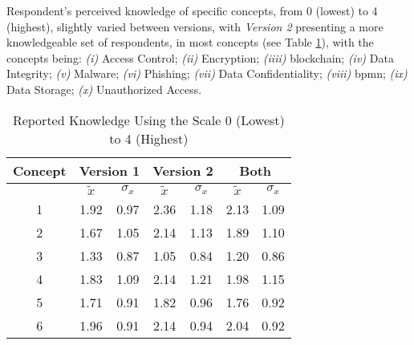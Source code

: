 Respondent's perceived knowledge of specific concepts, from 0 (lowest) to 4 (highest), slightly varied between versions, with \textit{Version 2} presenting a more knowledgeable set of respondents, in most concepts (see Table \ref{tab: knowledge}), with the concepts being: \emph{(i)} Access Control; \emph{(ii)} Encryption; \emph{(iiii)} blockchain; \emph{(iv)} Data Integrity; \emph{(v)} Malware; \emph{(vi)} Phishing; \emph{(vii)} Data Confidentiality; \emph{(viii)} \gls{bpmn}; \emph{(ix)} Data Storage; \emph{(x)} Unauthorized Access.

\begin{table}[htb]
	\centering
	\caption{Reported Knowledge Using the Scale 0 (Lowest) to 4 (Highest)}
	\label{tab: knowledge}
	\begin{tabular}{c|cc|cc|cc}
		\hline
		\bf Concept & \multicolumn{2}{c}{\bf Version 1} \vrule & \multicolumn{2}{c}{\bf Version 2} \vrule & \multicolumn{2}{c}{\bf Both}                                             \\
		\hline
		            & $\tilde{x}$                              & $\sigma_{x}$                             & $\tilde{x}$                  & $\sigma_{x}$ & $\tilde{x}$ & $\sigma_{x}$ \\
		\hline
		1           & 1.92                                     & 0.97                                     & 2.36                         & 1.18         & 2.13        & 1.09         \\
		\hline
		2           & 1.67                                     & 1.05                                     & 2.14                         & 1.13         & 1.89        & 1.10         \\
		\hline
		3           & 1.33                                     & 0.87                                     & 1.05                         & 0.84         & 1.20        & 0.86         \\
		\hline
		4           & 1.83                                     & 1.09                                     & 2.14                         & 1.21         & 1.98        & 1.15         \\
		\hline
		5           & 1.71                                     & 0.91                                     & 1.82                         & 0.96         & 1.76        & 0.92         \\
		\hline
		6           & 1.96                                     & 0.91                                     & 2.14                         & 0.94         & 2.04        & 0.92         \\

\end{tabular}
\end{table}
